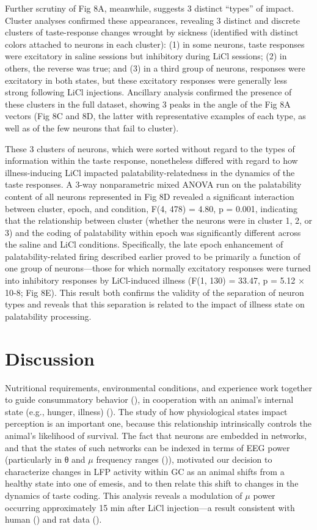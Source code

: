 \begin{refsection}
{Further scrutiny of Fig 8A, meanwhile, suggests 3 distinct “types” of impact. Cluster analyses confirmed these appearances, revealing 3 distinct and discrete clusters of taste-response changes wrought by sickness (identified with distinct colors attached to neurons in each cluster): (1) in some neurons, taste responses were excitatory in saline sessions but inhibitory during LiCl sessions; (2) in others, the reverse was true; and (3) in a third group of neurons, responses were excitatory in both states, but these excitatory responses were generally less strong following LiCl injections. Ancillary analysis confirmed the presence of these clusters in the full dataset, showing 3 peaks in the angle of the Fig 8A vectors (Fig 8C and 8D, the latter with representative examples of each type, as well as of the few neurons that fail to cluster).

These 3 clusters of neurons, which were sorted without regard to the types of information within the taste response, nonetheless differed with regard to how illness-inducing LiCl impacted palatability-relatedness in the dynamics of the taste responses. A 3-way nonparametric mixed ANOVA run on the palatability content of all neurons represented in Fig 8D revealed a significant interaction between cluster, epoch, and condition, F(4, 478) = 4.80, p = 0.001, indicating that the relationship between cluster (whether the neurons were in cluster 1, 2, or 3) and the coding of palatability within epoch was significantly different across the saline and LiCl conditions. Specifically, the late epoch enhancement of palatability-related firing described earlier proved to be primarily a function of one group of neurons—those for which normally excitatory responses were turned into inhibitory responses by LiCl-induced illness (F(1, 130) = 33.47, p = 5.12 × 10-8; Fig 8E). This result both confirms the validity of the separation of neuron types and reveals that this separation is related to the impact of illness state on palatability processing.


\section{Discussion}
Nutritional requirements, environmental conditions, and experience work together to guide consummatory behavior (\cite{parker1982a,provenza1995a,flores2018a}), in cooperation with an animal’s internal state (e.g., hunger, illness) (\cite{livneh2020a}). The study of how physiological states impact perception is an important one, because this relationship intrinsically controls the animal’s likelihood of survival. The fact that neurons are embedded in networks, and that the states of such networks can be indexed in terms of EEG power (particularly in θ and \(\mu\) frequency ranges (\cite{fontanini2005a,fontanini2006a,fontanini2008a})), motivated our decision to characterize changes in LFP activity within GC as an animal shifts from a healthy state into one of emesis, and to then relate this shift to changes in the dynamics of taste coding. This analysis reveals a modulation of \(\mu\) power occurring approximately 15 min after LiCl injection—a result consistent with human (\cite{chen2010a}) and rat data (\cite{aguilar-rivera2020a}).

}
\end{refsection}
